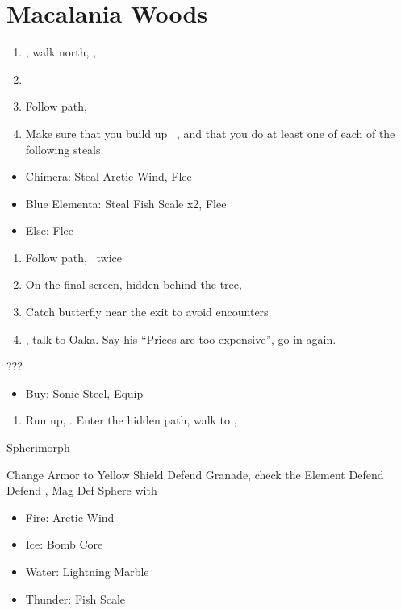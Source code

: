 \chapter{Macalania Woods}

\begin{enumerate}
	\item \sd, walk north, \sd, \save
	\item \formation{\tidus}{\rikku}{\auron}
	\item Follow path, 
	\item Make sure that you build up \rikku\ \od, and that you do at least one of each of the following steals.
\end{enumerate}
\begin{encounters}
\begin{itemize}
	\item Chimera: Steal Arctic Wind, Flee
	\item Blue Elementa: Steal Fish Scale x2, Flee
	\item Else: Flee
\end{itemize}
\end{encounters}
\begin{enumerate}[resume]
	\item Follow path, \sd\ twice
	\item On the final screen, hidden behind the tree, 
	\item Catch butterfly near the exit to avoid encounters
	\formation{\tidus}{\yuna}{\kimahri}
	\item \save, talk to Oaka. Say his ``Prices are too expensive'', go in again.
\end{enumerate}
\begin{shop}{???}
\begin{itemize}
	\item Buy: Sonic Steel, Equip
\end{itemize}
\end{shop}
\begin{enumerate}[resume]
	\item Run up, \sd. Enter the hidden path, walk to \auron, \sd
\end{enumerate}
\begin{battle}[12000]{Spherimorph}
\begin{itemize}
	\tidusf Change Armor to Yellow Shield
	\tidusf Defend
	\switch{\tidus}{\rikku}
	\rikkuf Granade, check the Element
	\kimahrif Defend
	\yunaf Defend
	\rikkuf \od, Mag Def Sphere with
	\begin{itemize}
		\item Fire: Arctic Wind
		\item Ice: Bomb Core
		\item Water: Lightning Marble
		\item Thunder: Fish Scale
	\end{itemize}
\end{itemize}
\end{battle}
